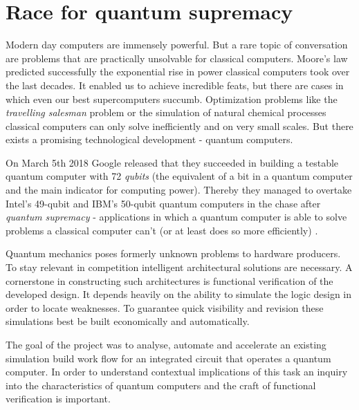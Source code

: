 
\chapter{Race for quantum supremacy}

Modern day computers are immensely powerful. But a rare topic of conversation are problems that are practically unsolvable for classical computers. Moore's law predicted successfully the exponential rise in power classical computers took over the last decades. It enabled us to achieve incredible feats, but there are cases in which even our best supercomputers succumb. Optimization problems like the \textit{travelling salesman} problem or the simulation of natural chemical processes classical computers can only solve inefficiently and on very small scales. But there exists a promising technological development - quantum computers.

On March 5th 2018 Google released that they succeeded in building a testable quantum computer with 72 \textit{qubits }(the equivalent of a bit in a quantum computer and the main indicator for computing power). Thereby they managed to overtake Intel's 49-qubit and IBM's 50-qubit quantum computers in the chase after \textit{quantum supremacy} - applications in which a quantum computer is able to solve problems a classical computer can't (or at least does so more efficiently) \cite[see][]{Emily18}.

Quantum mechanics poses formerly unknown problems to hardware producers. To stay relevant in competition intelligent architectural solutions are necessary. A cornerstone in constructing such architectures is functional verification of the developed design. It depends heavily on the ability to simulate the logic design in order to locate weaknesses. To guarantee quick visibility and revision these simulations best be built economically and automatically.

The goal of the project was to analyse, automate and accelerate an existing simulation build work flow for an integrated circuit that operates a quantum computer. In order to understand contextual implications of this task an inquiry into the characteristics of quantum computers and the craft of functional verification is important.